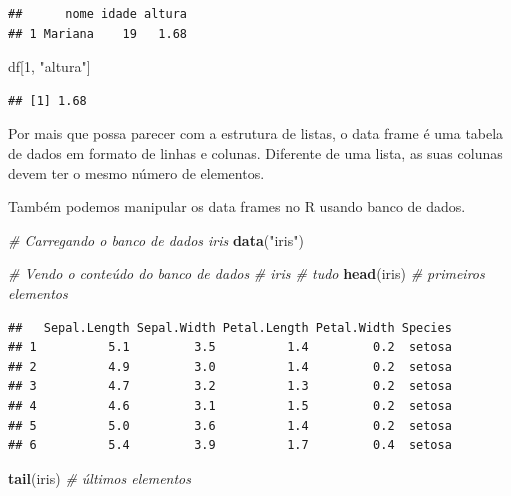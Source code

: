\documentclass[
]{book}
\newenvironment{Shaded}{\begin{snugshade}}{\end{snugshade}}
\newcommand{\CommentTok}[1]{\textcolor[rgb]{0.56,0.35,0.01}{\textit{#1}}}
\newcommand{\DecValTok}[1]{\textcolor[rgb]{0.00,0.00,0.81}{#1}}
\newcommand{\FunctionTok}[1]{\textcolor[rgb]{0.13,0.29,0.53}{\textbf{#1}}}
\newcommand{\NormalTok}[1]{#1}
\newcommand{\StringTok}[1]{\textcolor[rgb]{0.31,0.60,0.02}{#1}}
\begin{document}
\begin{verbatim}
##      nome idade altura
## 1 Mariana    19   1.68
\end{verbatim}

\begin{Shaded}
\begin{Highlighting}[]
\NormalTok{df[}\DecValTok{1}\NormalTok{, }\StringTok{"altura"}\NormalTok{] }
\end{Highlighting}
\end{Shaded}

\begin{verbatim}
## [1] 1.68
\end{verbatim}

Por mais que possa parecer com a estrutura de listas, o data frame é uma tabela de dados em formato de linhas e colunas. Diferente de uma lista, as suas colunas devem ter o mesmo número de elementos.

Também podemos manipular os data frames no R usando banco de dados.

\begin{Shaded}
\begin{Highlighting}[]
\CommentTok{\# Carregando o banco de dados \textquotesingle{}iris\textquotesingle{}}
\FunctionTok{data}\NormalTok{(}\StringTok{"iris"}\NormalTok{)}

\CommentTok{\# Vendo o conteúdo do banco de dados}
\CommentTok{\# iris \# tudo}
\FunctionTok{head}\NormalTok{(iris) }\CommentTok{\# primeiros elementos}
\end{Highlighting}
\end{Shaded}

\begin{verbatim}
##   Sepal.Length Sepal.Width Petal.Length Petal.Width Species
## 1          5.1         3.5          1.4         0.2  setosa
## 2          4.9         3.0          1.4         0.2  setosa
## 3          4.7         3.2          1.3         0.2  setosa
## 4          4.6         3.1          1.5         0.2  setosa
## 5          5.0         3.6          1.4         0.2  setosa
## 6          5.4         3.9          1.7         0.4  setosa
\end{verbatim}

\begin{Shaded}
\begin{Highlighting}[]
\FunctionTok{tail}\NormalTok{(iris) }\CommentTok{\# últimos elementos}
\end{Highlighting}
\end{Shaded}
\end{document}
